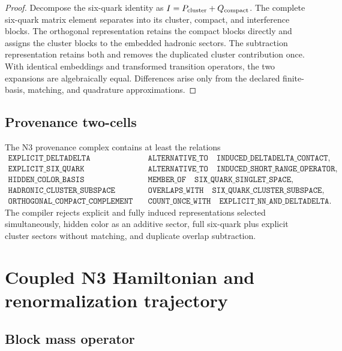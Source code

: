 \documentclass[11pt]{article}
\begin{document}
\begin{proof}
Decompose the six-quark identity as \(I=P_{\rm cluster}+Q_{\rm compact}\).  The complete six-quark matrix element separates into its cluster, compact, and interference blocks.  The orthogonal representation retains the compact blocks directly and assigns the cluster blocks to the embedded hadronic sectors.  The subtraction representation retains both and removes the duplicated cluster contribution once.  With identical embeddings and transformed transition operators, the two expansions are algebraically equal.  Differences arise only from the declared finite-basis, matching, and quadrature approximations.
\end{proof}

\subsection{Provenance two-cells}

The N3 provenance complex contains at least the relations
\begin{align*}
 \texttt{EXPLICIT\_DELTADELTA}
 &\quad\texttt{ALTERNATIVE\_TO}\quad
 \texttt{INDUCED\_DELTADELTA\_CONTACT},\\
 \texttt{EXPLICIT\_SIX\_QUARK}
 &\quad\texttt{ALTERNATIVE\_TO}\quad
 \texttt{INDUCED\_SHORT\_RANGE\_OPERATOR},\\
 \texttt{HIDDEN\_COLOR\_BASIS}
 &\quad\texttt{MEMBER\_OF}\quad
 \texttt{SIX\_QUARK\_SINGLET\_SPACE},\\
 \texttt{HADRONIC\_CLUSTER\_SUBSPACE}
 &\quad\texttt{OVERLAPS\_WITH}\quad
 \texttt{SIX\_QUARK\_CLUSTER\_SUBSPACE},\\
 \texttt{ORTHOGONAL\_COMPACT\_COMPLEMENT}
 &\quad\texttt{COUNT\_ONCE\_WITH}\quad
 \texttt{EXPLICIT\_NN\_AND\_DELTADELTA}.
\end{align*}
The compiler rejects explicit and fully induced representations selected simultaneously, hidden color as an additive sector, full six-quark plus explicit cluster sectors without matching, and duplicate overlap subtraction.

\section{Coupled N3 Hamiltonian and renormalization trajectory}
\label{sec:hamiltonian}

\subsection{Block mass operator}
\end{document}
